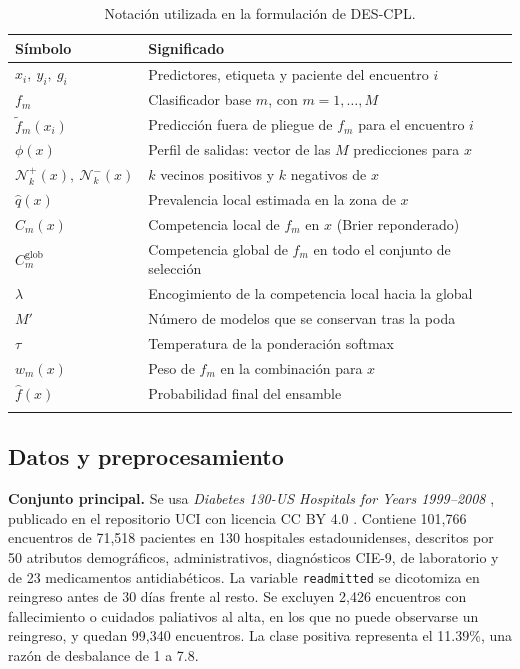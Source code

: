 \documentclass[pdflatex,sn-mathphys-num]{sn-jnl}
\theoremstyle{plain}
\begin{document}
\begin{table}[h]
\caption{Notación utilizada en la formulación de DES-CPL.}\label{tab:notacion}
\begin{tabular}{@{}ll@{}}
\toprule
Símbolo & Significado \\
\midrule
$x_i,\ y_i,\ g_i$ & Predictores, etiqueta y paciente del encuentro $i$ \\
$f_m$ & Clasificador base $m$, con $m=1,\dots,M$ \\
$\tilde{f}_m(x_i)$ & Predicción fuera de pliegue de $f_m$ para el encuentro $i$ \\
$\phi(x)$ & Perfil de salidas: vector de las $M$ predicciones para $x$ \\
$\mathcal{N}^{+}_{k}(x),\ \mathcal{N}^{-}_{k}(x)$ & $k$ vecinos positivos y $k$ negativos de $x$ \\
$\hat{q}(x)$ & Prevalencia local estimada en la zona de $x$ \\
$C_m(x)$ & Competencia local de $f_m$ en $x$ (Brier reponderado) \\
$C^{\text{glob}}_m$ & Competencia global de $f_m$ en todo el conjunto de selección \\
$\lambda$ & Encogimiento de la competencia local hacia la global \\
$M'$ & Número de modelos que se conservan tras la poda \\
$\tau$ & Temperatura de la ponderación softmax \\
$w_m(x)$ & Peso de $f_m$ en la combinación para $x$ \\
$\hat{f}(x)$ & Probabilidad final del ensamble \\
\botrule
\end{tabular}
\end{table}

\subsection{Datos y preprocesamiento}\label{subsec:datos}

\textbf{Conjunto principal.} Se usa \emph{Diabetes 130-US Hospitals for Years 1999--2008} \cite{bib_strack}, publicado en el repositorio UCI con licencia CC BY 4.0 \cite{bib_uci}. Contiene 101{,}766 encuentros de 71{,}518 pacientes en 130 hospitales estadounidenses, descritos por 50 atributos demográficos, administrativos, diagnósticos CIE-9, de laboratorio y de 23 medicamentos antidiabéticos. La variable \texttt{readmitted} se dicotomiza en reingreso antes de 30 días frente al resto. Se excluyen 2{,}426 encuentros con fallecimiento o cuidados paliativos al alta, en los que no puede observarse un reingreso, y quedan 99{,}340 encuentros. La clase positiva representa el 11.39\%, una razón de desbalance de 1 a 7.8.
\end{document}
